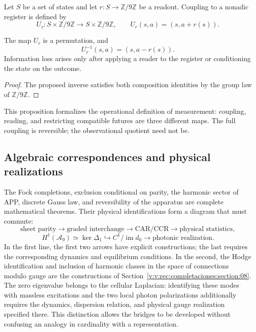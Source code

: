 Let \(S\) be a set of states and let \(r:S\to\mathbb Z/9\mathbb Z\) be a
readout. Coupling to a nonadic register is defined by
\[
 U_r:S\times\mathbb Z/9\mathbb Z\longrightarrow
 S\times\mathbb Z/9\mathbb Z,
 \qquad
 U_r(s,a)=(s,a+r(s)).
\]

\begin{proposition}
\label{v:v:rec:completaciones:statement:05}
The map \(U_r\) is a permutation, and
\[
 U_r^{-1}(s,a)=(s,a-r(s)).
\]
Information loss arises only after applying a reader to the
register or conditioning the state on the outcome.
\end{proposition}

\begin{proof}
The proposed inverse satisfies both composition identities by the
group law of \(\mathbb Z/9\mathbb Z\).
\end{proof}

This proposition formalizes the operational definition of measurement: coupling,
reading, and restricting compatible futures are three different maps. The
full coupling is reversible; the observational quotient need not be.

\subsection{Algebraic correspondences and physical realizations}
\label{v:v:rec:completaciones:section:11}

The Fock completions, exclusion conditional on parity, the harmonic
sector of APP, discrete Gauss law, and reversibility of the apparatus are complete
mathematical theorems. Their physical identifications form a diagram that
must commute:
\[
 \text{sheet parity}
 \longrightarrow\text{graded interchange}
 \longrightarrow\text{CAR/CCR}
 \longrightarrow\text{physical statistics},
\]
\[
 H^1(\mathcal A_9)\simeq\ker\Delta_1
 \hookrightarrow C^1/\operatorname{im}d_0
 \longrightarrow\text{photonic realization}.
\]
In the first line, the first two arrows have explicit
constructions; the last requires the corresponding dynamics and equilibrium
conditions. In the second, the Hodge identification and inclusion
of harmonic classes in the space of connections modulo gauge are the
constructions of Section~\ref{v:v:rec:completaciones:section:08}. The zero
eigenvalue belongs to the cellular Laplacian: identifying these modes with massless
excitations and the two local photon polarizations additionally requires the
dynamics, dispersion relation, and physical gauge realization specified
there. This distinction allows the bridges to be developed without confusing an
analogy in cardinality with a representation.
